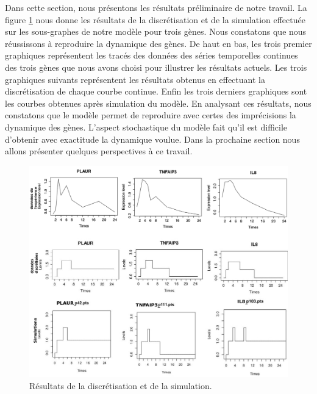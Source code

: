 Dans cette section, nous présentons les résultats préliminaire de notre travail. La figure \ref{fig:simulations} nous donne les résultats de la discrétisation et 
de la simulation effectuée sur les sous-graphes de notre modèle pour trois gènes. Nous constatons que nous réussissons à reproduire la dynamique des gènes. De haut en bas,
les trois premier graphiques représentent les tracés des données des séries temporelles continues des trois gènes que nous avons choisi pour illustrer les résultats actuels.
Les trois graphiques suivants représentent les résultats obtenus en effectuant la discrétisation de chaque courbe continue. Enfin les trois derniers graphiques sont les 
courbes obtenues après simulation du modèle. En analysant ces résultats, nous constatons que le modèle permet de reproduire avec certes des imprécisions la dynamique des gènes.
L'aspect stochastique du modèle fait qu'il est difficile d'obtenir avec exactitude la dynamique voulue. Dans la prochaine section nous allons présenter quelques perspectives à ce 
travail.

\begin{figure}[p]
\includegraphics[scale=0.35]{images/courbe-cst1.png}
\caption{\label{fig:simulations}
Résultats de la discrétisation et de la simulation.
}
\end{figure}
